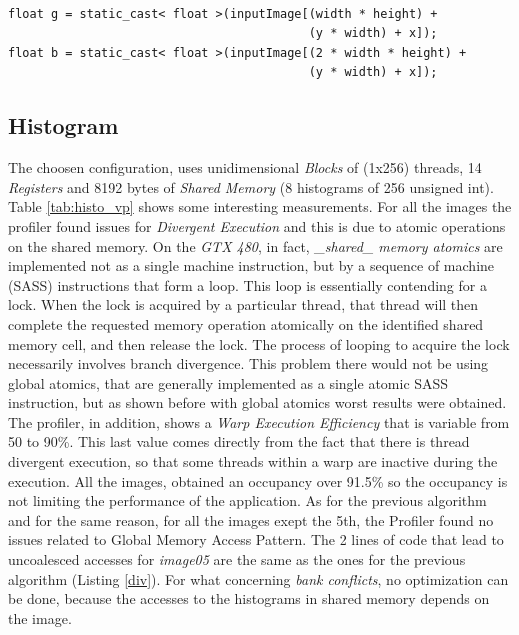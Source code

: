 \documentclass[a4paper]{article}
\begin{document}
\begin{lstlisting}[label=div, caption=Unaligned accesses]

float g = static_cast< float >(inputImage[(width * height) +
                                          (y * width) + x]);
float b = static_cast< float >(inputImage[(2 * width * height) +
                                          (y * width) + x]);

\end{lstlisting}
\FloatBarrier

\subsection{Histogram}
\label{sec:a2}
The choosen configuration, uses unidimensional \textit{Blocks} of (1x256) threads, 14 \textit{Registers} and 8192 bytes of \textit{Shared Memory} (8 histograms of 256 unsigned int). Table \ref{tab:histo_vp} shows some interesting measurements.
For all the images the profiler found issues for \textit{Divergent Execution} and this is due to atomic operations on the shared memory. On the \textit{GTX 480}, in fact, \textit{\_shared\_ memory atomics} are implemented not as a single machine instruction, but by a sequence of machine (SASS) instructions that form a loop.
This loop is essentially contending for a lock. When the lock is acquired by a particular thread, that thread will then complete the requested memory operation atomically on the identified shared memory cell, and then release the lock. The process of looping to acquire the lock necessarily involves branch divergence. This problem there would not be using global atomics, that are generally implemented as a single atomic SASS instruction, but as shown before with global atomics worst results were obtained. The profiler, in addition, shows a \textit{Warp Execution Efficiency} that is variable from 50 to 90\%.
This last value comes directly from the fact that there is thread divergent execution, so that some threads within a warp are inactive during the execution. All the images, obtained an occupancy over 91.5\% so the occupancy is not limiting the performance of the application. As for the previous algorithm and for the same reason, for all the images exept the 5th, the Profiler found no issues related to Global Memory Access Pattern. The 2 lines of code that lead to uncoalesced accesses for \textit{image05} are the same as the ones for the previous algorithm (Listing \ref{div}). For what concerning \textit{bank conflicts}, no optimization can be done, because the accesses to the histograms in shared memory depends on the image.
 
\end{document}
